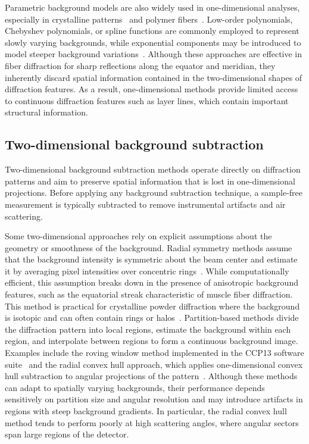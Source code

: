 \documentclass[iucr]{iucrjournals}
\begin{document}
Parametric background models are also widely used in one-dimensional analyses, especially in crystalline patterns~\cite{toby2013gsas2} and polymer fibers~\cite{grubb1992high_modulus_pe_fiber}. Low-order polynomials, Chebyshev polynomials, or spline functions are commonly employed to represent slowly varying backgrounds, while exponential components may be introduced to model steeper background variations~\cite{rajkumar2007fibrefix}. Although these approaches are effective in fiber diffraction for sharp reflections along the equator and meridian, they inherently discard spatial information contained in the two-dimensional shapes of diffraction features. As a result, one-dimensional methods provide limited access to continuous diffraction features such as layer lines, which contain important structural information.

\subsection{Two-dimensional background subtraction}

Two-dimensional background subtraction methods operate directly on diffraction patterns and aim to preserve spatial information that is lost in one-dimensional projections. Before applying any background subtraction technique, a sample-free measurement is typically subtracted to remove instrumental artifacts and air scattering.

Some two-dimensional approaches rely on explicit assumptions about the geometry or smoothness of the background. Radial symmetry methods assume that the background intensity is symmetric about the beam center and estimate it by averaging pixel intensities over concentric rings~\cite{rajkumar2007fibrefix}. While computationally efficient, this assumption breaks down in the presence of anisotropic background features, such as the equatorial streak characteristic of muscle fiber diffraction. This method is practical for crystalline powder diffraction where the background is isotopic and can often contain rings or halos~\cite{ashiotis2015pyfai}. Partition-based methods divide the diffraction pattern into local regions, estimate the background within each region, and interpolate between regions to form a continuous background image. Examples include the roving window method implemented in the CCP13 software suite~\cite{HeEtAl2007} and the radial convex hull approach, which applies one-dimensional convex hull subtraction to angular projections of the pattern~\cite{lee2019musclex}. Although these methods can adapt to spatially varying backgrounds, their performance depends sensitively on partition size and angular resolution and may introduce artifacts in regions with steep background gradients. In particular, the radial convex hull method tends to perform poorly at high scattering angles, where angular sectors span large regions of the detector.
\end{document}
